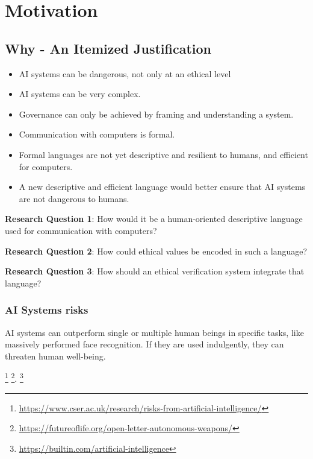 \chapter{Motivation}

\newcommand{\question}[1]{\textit{#1}}

\newcommand{\comment}[1]{{#1}}


\section{Why - An Itemized Justification}

\begin{itemize}
    \item AI systems can be dangerous, not only at an ethical level
    \item AI systems can be very complex.
    \item Governance can only be achieved by framing and understanding a system.~\cite{doi:10.1145/3278721.3278745}
    \item Communication with computers is formal.
    \item Formal languages are not yet descriptive and resilient to humans, and efficient for computers.
    \item A new descriptive and efficient language would better ensure that AI systems are not dangerous to humans.
\end{itemize}



\textbf{Research Question 1}: How would it be a human-oriented descriptive language used for communication with computers?


\textbf{Research Question 2}: How could ethical values be encoded in such a language?


\textbf{Research Question 3}: How should an ethical verification system integrate that language?

\subsection{AI Systems risks}

AI systems can outperform single or multiple human beings in specific tasks, like massively performed face recognition.
If they are used indulgently, they can threaten human well-being.

\footnote{\url{https://www.cser.ac.uk/research/risks-from-artificial-intelligence/}}
\footnote{\url{https://futureoflife.org/open-letter-autonomous-weapons/}}.
\footnote{\url{https://builtin.com/artificial-intelligence}}

